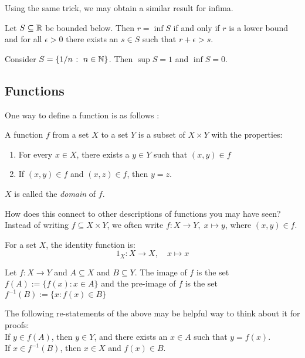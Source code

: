 \documentclass{article}
\begin{document}
Using the same trick, we may obtain a similar result for infima.

\begin{proposition}
 Let $S\subseteq {\mathbb{R}}$ be bounded below. Then $r= \inf S$ if and only if $r$ is a lower bound and for all $\epsilon>0$ there exists an $s\in S$ such that $r+\epsilon >s$. 
\end{proposition}

\begin{example}
Consider $S = \{1/n \; \colon \; n\in {\mathbb{N}}\}$. Then $\sup S = 1$ and $\inf S = 0$.
\end{example}


\subsection{Functions}

One way to define a function is as follows :
\begin{definition}
A function $f$ from a set $X$ to a set $Y$ is a subset of $X \times Y$ with the properties:
\begin{enumerate}
    \item For every $x \in X$, there exists a $y \in Y$ such that $(x,y) \in f$
    \item If $(x,y) \in f$ and $(x,z) \in f$, then $y = z$.
\end{enumerate}
$X$ is called the \emph{domain} of $f$.
\end{definition}
How does this connect to other descriptions of functions you may have seen? Instead of writing $f \subseteq X \times Y$, we often write $f: X \to Y, \; x \mapsto y$, where $(x,y) \in f$.

\begin{example}
For a set $X$, the identity function is:
$$ 1_X: X \to X, \quad x \mapsto x $$
\end{example}

\begin{definition}
Let $f:X \to Y$ and $A \subseteq X$ and $B \subseteq Y$. The image of $f$ is the set $f(A) := \{f(x): x \in A \}$ and the pre-image of $f$ is the set $f^{-1}(B) := \{x: f(x) \in B \}$
\end{definition}

The following re-statements of the above may be helpful way to think about it for proofs: \\
If $y \in f(A)$, then $y \in Y$, and there exists an $x \in A$ such that $y = f(x)$. \\
If $x \in f^{-1}(B)$, then $x \in X$ and $f(x) \in B$.
\end{document}
